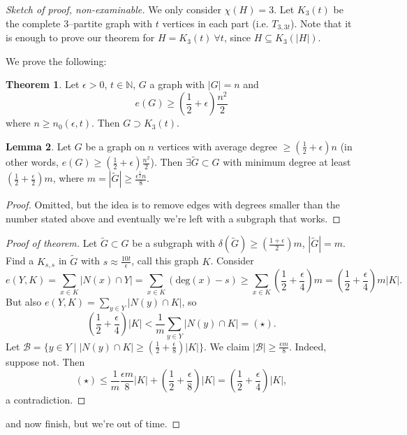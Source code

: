 \documentclass{article}
\theoremstyle{definition}
\newtheorem{theorem}{Theorem}[section]
\newtheorem{lemma}[theorem]{Lemma}
\begin{document}
\begin{proof}[Sketch of proof, non-examinable]
    We only consider $\chi(H)=3$. Let $K_3(t)$ be the complete $3$--partite graph with $t$ vertices in each part (i.e. $T_{3,3t}$). Note that it is enough to prove our theorem for $H=K_3(t) ~\forall t$, since $H \subseteq K_3(|H|)$.
    \vspace{1mm}
    
    We prove the following:
    \begin{theorem}
        Let $\epsilon>0$, $t \in \mathbb{N}$, $G$ a graph with $|G|=n$ and \[
        e(G)\ge \left(\frac{1}{2}+\epsilon \right)\frac{n^2}{2}
        \]
        where $n\ge n_0(\epsilon,t)$. Then $G \supset K_3(t)$.
    \end{theorem}
    \begin{lemma}
        Let $G$ be a graph on $n$ vertices with average degree $\ge (\frac{1}{2}+\epsilon)n$ (in other words, $e(G) \ge (\frac{1}{2}+\epsilon)\frac{n^2}{2}$). Then $\exists \tilde{G}\subset G$ with minimum degree at least $(\frac{1}{2}+\frac{\epsilon}{2})m$, where $m=|\tilde{G}|\ge \frac{\epsilon^{\frac{1}{2}}n}{8}$.
    \end{lemma}
    \begin{proof}
        Omitted, but the idea is to remove edges with degrees smaller than the number stated above and eventually we're left with a subgraph that works.
    \end{proof}
    \begin{proof}[Proof of theorem]
        Let $\tilde{G}\subset G$ be a subgraph with $\delta(\tilde{G})\ge (\frac{1+\epsilon}{2})m$, $|\tilde{G}|=m$. Find a $K_{s,s}$ in $\tilde{G}$ with $s \approx \frac{10t}{\epsilon}$, call this graph $K$. Consider \[
        e(Y,K)=\sum_{x \in K}^{} |N(x) \cap Y| = \sum_{x \in K}^{} \left( \text{deg}(x)-s \right) \ge \sum_{x \in K}^{} \left(\frac{1}{2}+\frac{\epsilon}{4}\right)m = \left(\frac{1}{2}+\frac{\epsilon}{4}\right)m |K|.
        \]
        But also $e(Y,K) = \sum_{y \in Y}^{} |N(y) \cap K|$, so \[
        \left(\frac{1}{2}+\frac{\epsilon}{4}\right) |K|< \frac{1}{m} \sum_{y \in Y}^{} |N(y) \cap K| = (\star). 
        \]
        Let $\mathcal{B} = \{y \in Y \mid |N(y) \cap K| \ge (\frac{1}{2}+\frac{\epsilon}{8})|K|\}$. We claim $|\mathcal{B}|\ge \frac{\epsilon m}{8}$. Indeed, suppose not. Then \[
            (\star)\le \frac{1}{m}\frac{\epsilon m}{8} |K| + \left(\frac{1}{2}+\frac{\epsilon}{8}\right) |K| = \left(\frac{1}{2}+\frac{\epsilon}{4}\right)|K|,
        \] a contradiction.
    \end{proof}
    and now finish, but we're out of time.
\end{proof}
\end{document}

